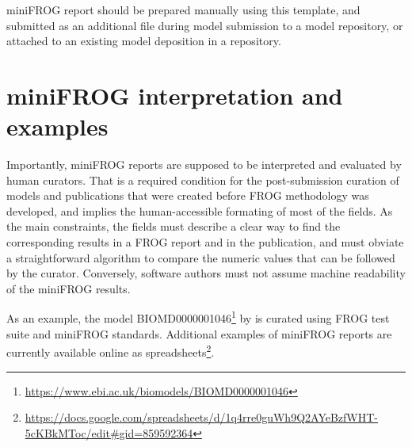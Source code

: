 miniFROG report should be prepared manually using this template, and submitted as an additional file during model submission to a model repository, or attached to an existing model deposition in a repository.

\section{miniFROG interpretation and examples}

Importantly, miniFROG reports are supposed to be interpreted and evaluated by human curators.
That is a required condition for the post-submission curation of models and publications that were created before FROG methodology was developed, and implies the human-accessible formating of most of the fields.
As the main constraints, the fields must describe a clear way to find the corresponding results in a FROG report and in the publication, and must obviate a straightforward algorithm to compare the numeric values that can be followed by the curator.
Conversely, software authors must not assume machine readability of the miniFROG results.

As an example, the model BIOMD0000001046\footnote{\url{https://www.ebi.ac.uk/biomodels/BIOMD0000001046}} by \textcite{raman2005flux} is curated using FROG test suite and miniFROG standards.
Additional examples of miniFROG reports are currently available online as spreadsheets\footnote{\url{https://docs.google.com/spreadsheets/d/1q4rre0guWh9Q2AYeBzfWHT-5cKBkMToc/edit\#gid=859592364}}.
